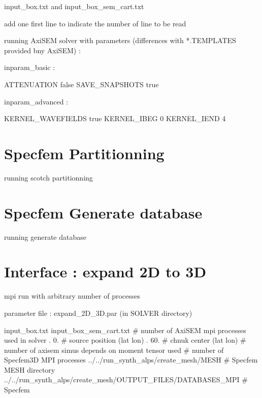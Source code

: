 \documentclass[a4paper,11pt]{article}
\begin{document}
input\_box.txt and input\_box\_sem\_cart.txt  \newline

add one first line to indicate the number of line to be read \newline
 
running AxiSEM solver with parameters (differences with *.TEMPLATES provided
bny AxiSEM) : \newline

inparam\_basic : \newline

ATTENUATION         false \newline
SAVE\_SNAPSHOTS     true \newline

inparam\_advanced : \newline

KERNEL\_WAVEFIELDS   true \newline
KERNEL\_IBEG         0 \newline
KERNEL\_IEND         4 \newline


\section{Specfem Partitionning}

running scotch partitionning

\section{Specfem Generate database}

running generate database

\section{Interface : expand 2D to 3D}

mpi run with arbitrary number of processes  \newline

parameter file : expand\_2D\_3D.par (in SOLVER directory)\newline

input\_box.txt \newline
input\_box\_sem\_cart.txt                           \# number of AxiSEM mpi processes used in solver  . 0.                     \# source position (lat lon)  .  60.                    \# chnuk center (lat lon)                              \# number of axisem simus depends on moment tensor
used                            \# number of Specfem3D MPI processes   \newline
../../run\_synth\_alps/create\_mesh/MESH \# Specfem MESH directory  \newline
../../run\_synth\_alps/create\_mesh/OUTPUT\_FILES/DATABASES\_MPI \# Specfem
\end{document}
